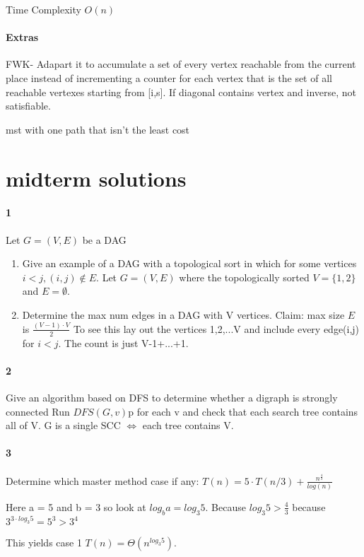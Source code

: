 \documentclass[10 pt]{article}
\begin{document}
Time Complexity $O(n)$

\paragraph{Extras}
FWK- Adapart it to accumulate a set of every vertex reachable from the current place instead of incrementing a counter for each vertex that is the set of all reachable vertexes starting from [i,s]. If diagonal contains vertex and inverse, not satisfiable.



mst with one path that isn't the least cost

\section{midterm solutions}

\paragraph{1} Let $G=(V,E)$ be a DAG
\begin{enumerate}
\item Give an example of a DAG with a topological sort in which for some vertices $i < j, (i,j) \not \in E$.
Let $G=(V,E)$ where the topologically sorted $V = \{1,2\}$ and $ E = \emptyset$.
\item Determine the max num edges in a DAG with V vertices.
Claim: max size $E$ is $\frac{(V-1) \cdot V}{2}$ To see this lay out the vertices 1,2,...V and include every edge(i,j) for $i<j$. The count is just V-1+...+1.
\end{enumerate}
\paragraph{2}Give an algorithm based on DFS to determine whether a digraph is strongly connected
Run $DFS(G,v)$p for each v and check that each search tree contains all of V. 
G is a single SCC $\Leftrightarrow$ each tree contains V.
\paragraph{3}Determine which master method case if any: 
$T(n) = 5 \cdot T(n/3) + \frac{n^{\frac{4}{3}} }{log(n)}$

Here a = 5 and b = 3 so look at $log_b a = log _3 5$.
Because $log_3 5 > \frac{4}{3}$ because $3^{3 \cdot log_3 5} = 5^3 > 3^4$

This yields case 1 $T(n) = \Theta (n^{log_3 5})$.
\end{document}
